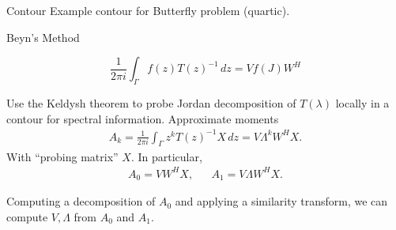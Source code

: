 \documentclass[mathserif, xcolor=table]{beamer}
\begin{document}
\begin{frame}{Contour}
	Example contour for Butterfly problem (quartic).
    \begin{figure}[htbp]
            \centering
    \end{figure}
\end{frame}


\begin{frame}{Beyn's Method}

	\begin{equation}
		\frac{1}{2 \pi i} \int_\Gamma f(z) {T(z)}^{-1} \, dz = V f(J) W^H 
	\end{equation}

	Use the Keldysh theorem to probe Jordan decomposition of \( T(\lambda) \) locally in a contour for spectral information. Approximate moments
	\begin{align}
		A_k = \frac{1}{2 \pi i} \int_\Gamma z^k {T(z)}^{-1} X \, dz
		= V \Lambda^k W^H X.
	\end{align}
	With ``probing matrix'' \( X \). In particular,
	\begin{align}
		A_0 = VW^H X,
		&&
		A_1 = V \Lambda W^H X.
	\end{align}

	\vspace{1em}	

	Computing a decomposition of \( A_0 \) and applying a similarity transform, we can compute \( V, \Lambda \) from \( A_0 \) and \( A_1 \).
	
	\vspace{1em}



\end{frame}
\end{document}
